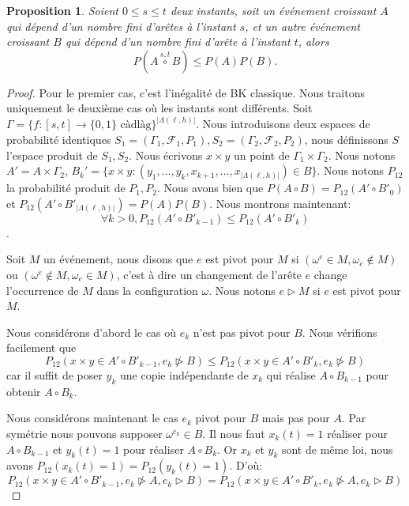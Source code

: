 \documentclass[titlepage,a4paper,12pt]{article}
\newcounter{prop}
\newtheorem{bk}[prop]{Proposition}
\begin{document}
\begin{bk}
Soient $0 \leqslant s \leqslant t$ deux instants, soit un événement croissant $A$ qui dépend d'un nombre fini d'arêtes à l'instant $s$, et un autre événement croissant $B$ qui dépend d'un nombre fini d'arête à l'instant $t$, alors $$P(A\overset{s,t}{\circ}B) \leqslant P(A)P(B).$$
\end{bk}

\begin{proof}
Pour le premier cas, c'est l'inégalité de BK classique. Nous traitons uniquement le deuxième cas où les instants sont différents. Soit $\Gamma = \{f:[s,t]\rightarrow\{0,1\}\text{ càdlàg} \}^{|\Lambda(\ell,h)|}$. Nous introduisons deux espaces de probabilité identiques $S_1 = (\Gamma_1,\mathcal{F}_1,P_1), S_2 = (\Gamma_2,\mathcal{F}_2,P_2)$, nous définissons $S$ l'espace produit de $S_1,S_2$. Nous écrivons $x\times y$ un point de $\Gamma_1 \times \Gamma_2$. Nous notons $A' = A\times \Gamma_2$, $B_k' = \{x\times y :(y_1,\dots,y_k,x_{k+1},\dots,x_{|\Lambda(\ell,h)|}) \in B\}$. Nous notons $P_{12}$ la probabilité produit de $P_1,P_2$. Nous avons bien que $P(A\circ B) = P_{12}(A'\circ B'_0)$ et $P_{12}(A'\circ B'_{|\Lambda(\ell,h)|}) = P(A)P(B)$. Nous montrons maintenant: $$\forall k>0, P_{12}(A'\circ B'_{k-1}) \leqslant P_{12}(A'\circ B'_k)$$. 

Soit $M$ un événement, nous disons que $e$ est pivot pour $M$ si $(\omega^e \in M, \omega_e\notin M)$ ou $(\omega^e \notin M, \omega_e\in M)$, c'est à dire un changement de l'arête $e$ change l'occurrence de $M$ dans la configuration $\omega$. Nous notons $e\triangleright M$ si $e$ est pivot pour $M$.

Nous considérons d'abord le cas où $e_k$ n'est pas pivot pour $B$. Nous vérifions facilement que 
$$ P_{12}(x\times y \in A'\circ B'_{k-1}, e_k \ntriangleright B) \leqslant P_{12}(x\times y \in A'\circ B'_k,e_k \ntriangleright B)
$$
car il suffit de poser $y_k$ une copie indépendante de $x_k$ qui réalise $A\circ B_{k-1}$ pour obtenir $A\circ B_k$.

Nous considérons maintenant le cas $e_k$ pivot pour $B$ mais pas pour $A$. Par symétrie nous pouvons supposer $ \omega^{e_k}\in B$. Il nous faut $x_k(t)=1$ réaliser pour $A\circ B_{k-1}$ et $y_k(t)= 1$ pour réaliser $A\circ B_k$. Or $x_k$ et $y_k$ sont de même loi, nous avons $P_{12}(x_k(t)=1) = P_{12}(y_k(t)=1)$. D'où:
$$P_{12}(x\times y \in A'\circ B'_{k-1}, e_k \ntriangleright A,e_k \triangleright B) = P_{12}(x\times y \in A'\circ B'_k,e_k \ntriangleright A, e_k \triangleright B)
$$


\end{proof}
\end{document}
